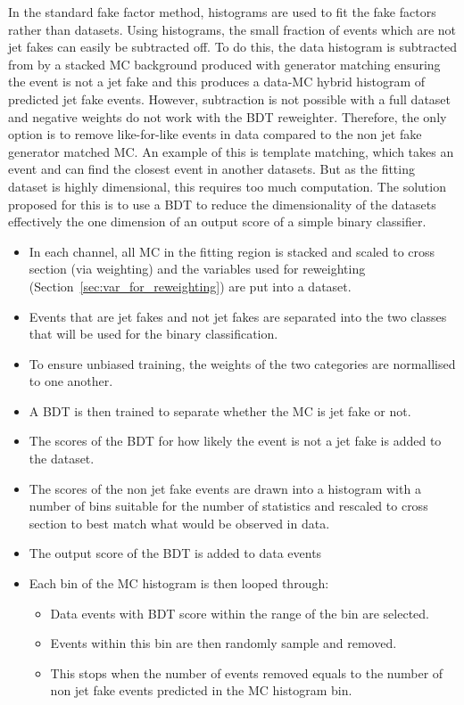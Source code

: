 In the standard fake factor method, histograms are used to fit the fake factors rather than datasets. 
Using histograms, the small fraction of events which are not jet fakes can easily be subtracted off. 
To do this, the data histogram is subtracted from by a stacked MC background produced with generator matching ensuring the event is not a jet fake and this produces a data-MC hybrid histogram of predicted jet fake events.
However, subtraction is not possible with a full dataset and negative weights do not work with the BDT reweighter. 
Therefore, the only option is to remove like-for-like events in data compared to the non jet fake generator matched MC.
An example of this is template matching, which takes an event and can find the closest event in another datasets.
But as the fitting dataset is highly dimensional, this requires too much computation.
The solution proposed for this is to use a BDT to reduce the dimensionality of the datasets effectively the one dimension of an output score of a simple binary classifier.

\begin{itemize} 
  \item In each channel, all MC in the fitting region is stacked and scaled to cross section (via weighting) and the variables used for reweighting (Section~\ref{sec:var_for_reweighting}) are put into a dataset.
  \item Events that are jet fakes and not jet fakes are separated into the two classes that will be used for the binary classification.
  \item To ensure unbiased training, the weights of the two categories are normallised to one another.
  \item A BDT is then trained to separate whether the MC is jet fake or not.
  \item The scores of the BDT for how likely the event is not a jet fake is added to the dataset.
  \item The scores of the non jet fake events are drawn into a histogram with a number of bins suitable for the number of statistics and rescaled to cross section to best match what would be observed in data.
  \item The output score of the BDT is added to data events
  \item Each bin of the MC histogram is then looped through:
  \begin{itemize}
    \item Data events with BDT score within the range of the bin are selected.
    \item Events within this bin are then randomly sample and removed.
    \item This stops when the number of events removed equals to the number of non jet fake events predicted in the MC histogram bin.
  \end{itemize}
\end{itemize}

